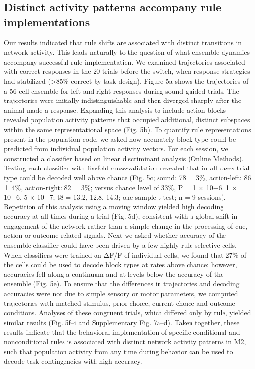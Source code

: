 \subsection{Distinct activity patterns accompany rule implementations}
Our results indicated that rule shifts are associated with distinct transitions in network activity. This leads naturally to the question of what ensemble dynamics accompany successful rule implementation. We examined trajectories associated with correct responses in the 20 trials before the switch, when response strategies had stabilized (>85\% correct by task design). Figure 5a shows the trajectories of a 56-cell ensemble for left and right responses during sound-guided trials. The trajectories were initially indistinguishable and then diverged sharply after the animal made a response. Expanding this analysis to include action blocks revealed population activity patterns that occupied additional, distinct subspaces within the same representational space (Fig. 5b). To quantify rule representations present in the population code, we asked how accurately block type could be predicted from individual population activity vectors. For each session, we constructed a classifier based on linear discriminant analysis (Online Methods). Testing each classifier with fivefold cross-validation revealed that in all cases trial type could be decoded well above chance (Fig. 5c; sound: 78 ± 3\%, action-left: 86 ± 4\%, action-right: 82 ± 3\%; versus chance level of 33\%, P = 1 × 10−6, 1 × 10−6, 5 × 10−7; t8 = 13.2, 12.8, 14.3; one-sample t-test; n = 9 sessions). Repetition of this analysis using a moving window yielded high decoding accuracy at all times during a trial (Fig. 5d), consistent with a global shift in engagement of the network rather than a simple change in the processing of cue, action or outcome related signals. Next we asked whether accuracy of the ensemble classifier could have been driven by a few highly rule-selective cells. When classifiers were trained on ΔF/F of individual cells, we found that 27\% of the cells could be used to decode block types at rates above chance; however, accuracies fell along a continuum and at levels below the accuracy of the ensemble (Fig. 5e). To ensure that the differences in trajectories and decoding accuracies were not due to simple sensory or motor parameters, we computed trajectories with matched stimulus, prior choice, current choice and outcome conditions. Analyses of these congruent trials, which differed only by rule, yielded similar results (Fig. 5f–i and Supplementary Fig. 7a–d). Taken together, these results indicate that the behavioral implementation of specific conditional and nonconditional rules is associated with distinct network activity patterns in M2, such that population activity from any time during behavior can be used to decode task contingencies with high accuracy.

